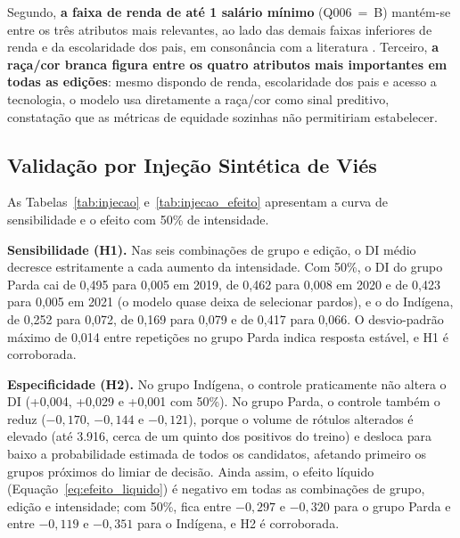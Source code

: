 

Segundo, \textbf{a faixa de renda de até 1 salário mínimo} (Q006~=~B) mantém-se entre os três atributos mais relevantes, ao lado das demais faixas inferiores de renda e da escolaridade dos pais, em consonância com a literatura \cite{souza2025desigualdades}. Terceiro, \textbf{a raça/cor branca figura entre os quatro atributos mais importantes em todas as edições}: mesmo dispondo de renda, escolaridade dos pais e acesso a tecnologia, o modelo usa diretamente a raça/cor como sinal preditivo, constatação que as métricas de equidade sozinhas não permitiriam estabelecer.

\subsection{Validação por Injeção Sintética de Viés}
\label{sec:res_injecao}

As Tabelas~\ref{tab:injecao} e~\ref{tab:injecao_efeito} apresentam a curva de sensibilidade e o efeito com 50\% de intensidade.



\textbf{Sensibilidade (H1).} Nas seis combinações de grupo e edição, o DI médio decresce estritamente a cada aumento da intensidade. Com 50\%, o DI do grupo Parda cai de 0,495 para 0,005 em 2019, de 0,462 para 0,008 em 2020 e de 0,423 para 0,005 em 2021 (o modelo quase deixa de selecionar pardos), e o do Indígena, de 0,252 para 0,072, de 0,169 para 0,079 e de 0,417 para 0,066. O desvio-padrão máximo de 0,014 entre repetições no grupo Parda indica resposta estável, e H1 é corroborada.

\textbf{Especificidade (H2).} No grupo Indígena, o controle praticamente não altera o DI (+0,004, +0,029 e +0,001 com 50\%). No grupo Parda, o controle também o reduz ($-0{,}170$, $-0{,}144$ e $-0{,}121$), porque o volume de rótulos alterados é elevado (até 3.916, cerca de um quinto dos positivos do treino) e desloca para baixo a probabilidade estimada de todos os candidatos, afetando primeiro os grupos próximos do limiar de decisão. Ainda assim, o efeito líquido (Equação~\ref{eq:efeito_liquido}) é negativo em todas as combinações de grupo, edição e intensidade; com 50\%, fica entre $-0{,}297$ e $-0{,}320$ para o grupo Parda e entre $-0{,}119$ e $-0{,}351$ para o Indígena, e H2 é corroborada.




